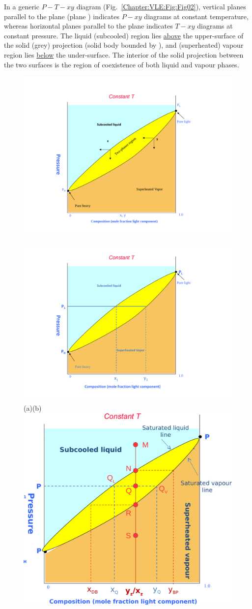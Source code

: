 In a generic $P-T-xy$ diagram (Fig.~\ref{Chapter:VLE:Fig:Fig02}), vertical planes parallel to the  plane (\eg plane ) indicates $P-xy$ diagrams at constant temperature, whereas horizontal planes parallel to the  plane indicates $T-xy$ diagrams at constant pressure. The liquid (\ie subcooled) region lies \underline{above} the upper-surface of the solid (grey) projection (solid body bounded by ), and (superheated) vapour region lies \underline{below} the under-surface. The interior of the solid projection between the two surfaces is the region of coexistence of both liquid and vapour phases. 
      \begin{figure}[h]
        \vbox{\hbox{\hspace{0.cm}\includegraphics[width=.5\linewidth,clip]{./../Pics/VLE_Pxy_Diagram1}
            \hspace{-2.cm}\includegraphics[width=.5\linewidth,clip]{./../Pics/VLE_Pxy_Diagram2}}
          \vspace{-0.5cm}
          \hbox{\hspace{3.5cm}(a)\hspace{6cm}(b)}
          \vspace{-0.cm}
          \hbox{\hspace{3.cm}\includegraphics[width=.5\linewidth,clip]{./../Pics/VLE_Pxy_Diagram3b}}
}
\end{figure}
